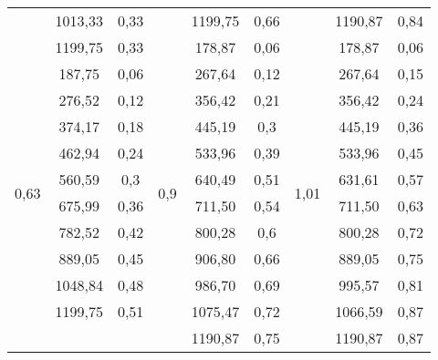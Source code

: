 \begin{table}[H]
\begin{tabular}{|c|c|c||c|c|c||c|c|c|}
                       & 1013,33 & 0,33 &                       & 1199,75 & 0,66 &                        & 1190,87 & 0,84 \\ \cline{2-9} 
                       & 1199,75 & 0,33 & \multirow{12}{*}{0,9} & 178,87  & 0,06 & \multirow{12}{*}{1,01} & 178,87  & 0,06 \\ \cline{1-3} \cline{5-6} \cline{8-9} 
\multirow{10}{*}{0,63} & 187,75  & 0,06 &                       & 267,64  & 0,12 &                        & 267,64  & 0,15 \\ \cline{2-3} \cline{5-6} \cline{8-9} 
                       & 276,52  & 0,12 &                       & 356,42  & 0,21 &                        & 356,42  & 0,24 \\ \cline{2-3} \cline{5-6} \cline{8-9} 
                       & 374,17  & 0,18 &                       & 445,19  & 0,3  &                        & 445,19  & 0,36 \\ \cline{2-3} \cline{5-6} \cline{8-9} 
                       & 462,94  & 0,24 &                       & 533,96  & 0,39 &                        & 533,96  & 0,45 \\ \cline{2-3} \cline{5-6} \cline{8-9} 
                       & 560,59  & 0,3  &                       & 640,49  & 0,51 &                        & 631,61  & 0,57 \\ \cline{2-3} \cline{5-6} \cline{8-9} 
                       & 675,99  & 0,36 &                       & 711,50  & 0,54 &                        & 711,50  & 0,63 \\ \cline{2-3} \cline{5-6} \cline{8-9} 
                       & 782,52  & 0,42 &                       & 800,28  & 0,6  &                        & 800,28  & 0,72 \\ \cline{2-3} \cline{5-6} \cline{8-9} 
                       & 889,05  & 0,45 &                       & 906,80  & 0,66 &                        & 889,05  & 0,75 \\ \cline{2-3} \cline{5-6} \cline{8-9} 
                       & 1048,84 & 0,48 &                       & 986,70  & 0,69 &                        & 995,57  & 0,81 \\ \cline{2-3} \cline{5-6} \cline{8-9} 
                       & 1199,75 & 0,51 &                       & 1075,47 & 0,72 &                        & 1066,59 & 0,87 \\ \cline{1-3} \cline{5-6} \cline{8-9} 
\multicolumn{3}{c|}{}                  &
& 1190,87 & 0,75 &
& 1190,87 & 0,87 \\ \cline{4-9}
\end{tabular}
\end{table}


